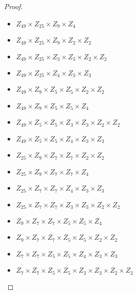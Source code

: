 \documentclass[10pt]{article}
\begin{document}
\begin{itemize}
\begin{proof}
\begin{item}
\begin{itemize}
	\item $Z_{49} \times Z_{25} \times Z_9 \times Z_4$
	\item $Z_{49} \times Z_{25} \times Z_9 \times Z_2 \times Z_2$
	\item $Z_{49} \times Z_{25} \times Z_3 \times Z_3 \times Z_2 \times Z_2$
	\item $Z_{49} \times Z_{25} \times Z_4 \times Z_3 \times Z_3$
	\item $Z_{49} \times Z_{9} \times Z_5 \times Z_5 \times Z_2 \times Z_2$
	\item $Z_{49} \times Z_{9} \times Z_5 \times Z_5 \times Z_4$
	\item $Z_{49} \times Z_{5} \times Z_5 \times Z_3 \times Z_3 \times Z_2 \times Z_2$	
	\item $Z_{49} \times Z_{5} \times Z_5 \times Z_4 \times Z_3 \times Z_3$	
	\item $Z_{25} \times Z_{9} \times Z_7 \times Z_7 \times Z_2 \times Z_2$
	\item $Z_{25} \times Z_{9} \times Z_7 \times Z_7 \times Z_4$
	\item $Z_{25} \times Z_{7} \times Z_7 \times Z_4 \times Z_3 \times Z_3$
	\item $Z_{25} \times Z_{7} \times Z_7 \times Z_3 \times Z_3 \times Z_2 \times Z_2$
	\item $Z_{9} \times Z_7 \times Z_7 \times Z_5 \times Z_5 \times Z_4$
	\item $Z_{9} \times Z_7 \times Z_7 \times Z_5 \times Z_5 \times Z_2 \times Z_2 $
	\item $Z_{7} \times Z_7 \times Z_5 \times Z_5 \times Z_4 \times Z_3 \times Z_3$
	\item $Z_{7} \times Z_7 \times Z_5 \times Z_5 \times Z_3 \times Z_3 \times Z_2 \times Z_2 $
\end{itemize}


\end{item}
\end{proof}
\end{itemize}
\end{document}
